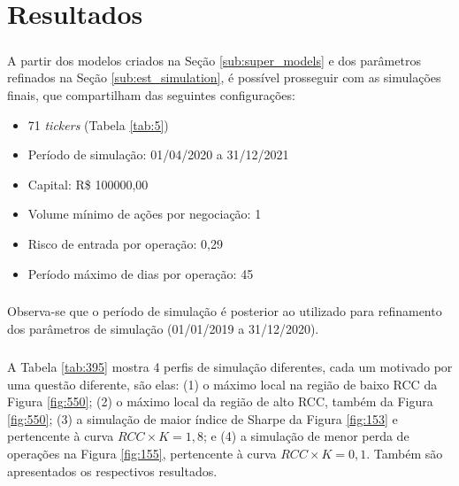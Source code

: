 \chapter{Resultados}
\label{cap4}


\FloatBarrier

\paragraph{} A partir dos modelos criados na Seção \ref{sub:super_models} e dos parâmetros refinados na Seção \ref{sub:est_simulation}, é possível prosseguir com as simulações finais, que compartilham das seguintes configurações:

\begin{itemize}
    \item 71 \textit{tickers} (Tabela \ref{tab:5})
    \item Período de simulação: 01/04/2020 a 31/12/2021
    \item Capital: R\$ 100000,00
    \item Volume mínimo de ações por negociação: 1
    \item Risco de entrada por operação: 0,29
    \item Período máximo de dias por operação: 45
\end{itemize}

\paragraph{} Observa-se que o período de simulação é posterior ao utilizado para refinamento dos parâmetros de simulação (01/01/2019 a 31/12/2020).

\paragraph{} A Tabela \ref{tab:395} mostra 4 perfis de simulação diferentes, cada um motivado por uma questão diferente, são elas: (1) o máximo local na região de baixo RCC da Figura \ref{fig:550}; (2) o máximo local da região de alto RCC, também da Figura \ref{fig:550}; (3) a simulação de maior índice de Sharpe da Figura \ref{fig:153} e pertencente à curva \begin{math} RCC \times K = 1,8 \end{math}; e (4) a simulação de menor perda de operações na Figura \ref{fig:155}, pertencente à curva \begin{math} RCC \times K = 0,1 \end{math}. Também são apresentados os respectivos resultados.


